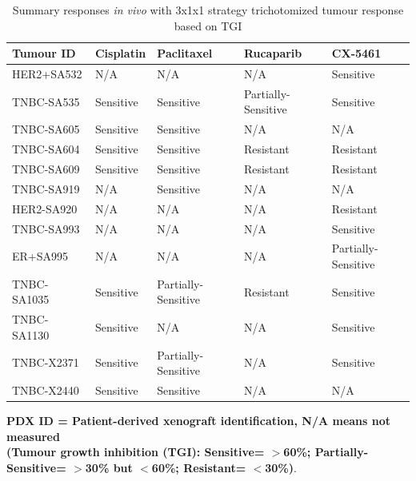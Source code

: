 \begin{table}[htbp]
  \centering
  \caption{Summary responses \textit{in vivo} with 3x1x1 strategy trichotomized tumour response based on TGI \cite{hather2014growth, aykan2020objective}}
    \begin{tabular}{|l|l|l|l|l|}
    
     \hline
    \textbf{Tumour ID} & \textbf{Cisplatin} & \textbf{Paclitaxel} & \textbf{Rucaparib} & \textbf{CX-5461} \\
     \hline
    HER2+SA532 & N/A   & N/A   & N/A   & Sensitive \\
    TNBC-SA535 & Sensitive & Sensitive & Partially-Sensitive & Sensitive \\
    TNBC-SA605 & Sensitive & Sensitive & N/A   & N/A \\
    TNBC-SA604 & Sensitive & Sensitive & Resistant & Resistant \\
    TNBC-SA609 & Sensitive & Sensitive & Resistant & Resistant \\
    TNBC-SA919 & N/A   & Sensitive & N/A   & N/A \\
    HER2-SA920 & N/A   & N/A   & N/A   & Resistant \\
    TNBC-SA993 & N/A   & N/A   & N/A   & Sensitive \\
    ER+SA995 & N/A   & N/A   & N/A   & Partially-Sensitive \\
    TNBC-SA1035 & Sensitive & Partially-Sensitive & Resistant & Sensitive \\
    TNBC-SA1130 & Sensitive & N/A   & N/A   & Sensitive \\
    TNBC-X2371 & Sensitive & Partially-Sensitive & N/A   & Sensitive \\
    TNBC-X2440 & Sensitive & Sensitive & N/A   & N/A \\
     \hline
    \end{tabular}
   \label{tab:PDXtumorsinvivo}
 
 \small\textbf{PDX ID = Patient-derived xenograft identification, N/A means not measured}\\
 

   \small\textbf{ (Tumour growth inhibition (TGI): Sensitive= $>$60\%; Partially-Sensitive= $>$30\% but $<$60\%; Resistant= $<$30\%)}.
\end{table}%





